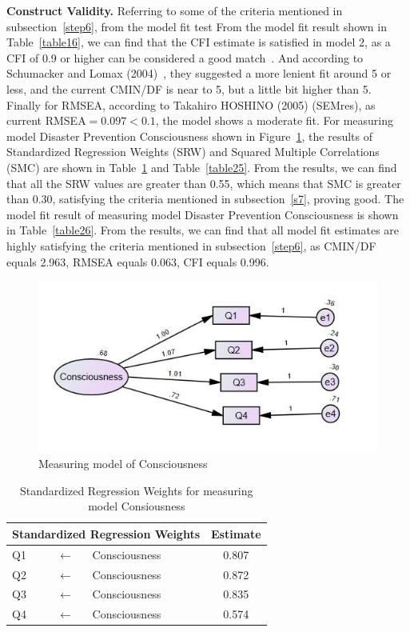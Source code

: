 \textbf{Construct Validity.} Referring to some of the criteria mentioned in subsection~\ref{step6}, from the model fit test From the model fit result shown in Table~\ref{table16}, we can find that the CFI estimate is satisfied in model 2, as a CFI of 0.9 or higher can be considered a good match~\cite{ref43,ref44}. And according to Schumacker and Lomax (2004)~\cite{ref39}, they suggested a more lenient fit around 5 or less, and the current CMIN/DF is near to 5, but a little bit higher than 5. Finally for RMSEA, according to Takahiro HOSHINO (2005)  (SEMres), as current RMSEA$=0.097<0.1$, the model shows a moderate fit. For measuring model Disaster Prevention Consciousness shown in Figure~\ref{fig31}, the results of Standardized Regression Weights (SRW) and Squared Multiple Correlations (SMC) are shown in Table~\ref{table24} and Table~\ref{table25}. From the results, we can find that all the SRW values are greater than 0.55, which means that SMC is greater than 0.30, satisfying the criteria mentioned in subsection~\ref{s7}, proving good. The model fit result of measuring model Disaster Prevention Consciousness is shown in Table~\ref{table26}. From the results, we can find that all model fit estimates are highly satisfying the criteria mentioned in subsection~\ref{step6}, as CMIN/DF equals 2.963, RMSEA equals 0.063, CFI equals 0.996. 


\begin{figure}[t]
  \includegraphics[width=0.5\linewidth]{Figure/figure31.JPG}
  \centering
  \caption{Measuring model of Consciousness}
  \label{fig31}
\end{figure}

\begin{table}[h]
  \caption{Standardized Regression Weights for measuring model Consiousness}
  \label{table24}
  \centering
  \begin{tabular}{lcl|c}
  \hline
   \multicolumn{3}{c|}{Standardized Regression Weights} & Estimate \\
  \hline
  Q1 & $\longleftarrow$ & Consciousness & 0.807 \\
  Q2 & $\longleftarrow$ & Consciousness & 0.872 \\
  Q3 & $\longleftarrow$ & Consciousness & 0.835 \\
  Q4 & $\longleftarrow$ & Consciousness & 0.574 \\
  \hline
  \end{tabular}
\end{table}

